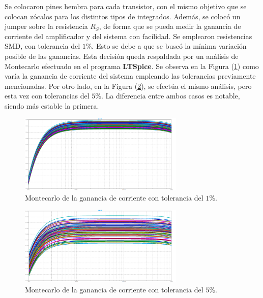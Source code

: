 Se colocaron pines hembra para cada transistor, con el mismo objetivo que se colocan zócalos para los distintos tipos de integrados. Además, se colocó un jumper sobre la resistencia $R_S$, de forma que se pueda medir la ganancia de corriente del amplificador y del sistema  con facilidad. Se emplearon resistencias SMD, con tolerancia del $1\%$. Esto se debe a que se buscó la mínima variación posible de las ganancias. Esta decisión queda respaldada por un análisis de Montecarlo efectuado en el programa \textbf{LTSpice}. Se observa en la Figura (\ref{fig:mc-ai1}) como varía la ganancia de corriente del sistema empleando las tolerancias previamente mencionadas. Por otro lado, en la Figura (\ref{fig:mc-ai2}), se efectúa el mismo análisis, pero esta vez con tolerancias del $5\%$. La diferencia entre ambos casos es notable, siendo más estable la primera.
\begin{figure}[H]
\centering
	\includegraphics[width=0.7\textwidth]{Imagenes/MC-Ai.png}
	\caption{Montecarlo de la ganancia de corriente con tolerancia del $1\%$.}
	\label{fig:mc-ai1}
\end{figure}
\begin{figure}[H]
\centering
	\includegraphics[width=0.7\textwidth]{Imagenes/MC-Ai_2.png}
	\caption{Montecarlo de la ganancia de corriente con tolerancia del $5\%$.}
	\label{fig:mc-ai2}
\end{figure}

%

